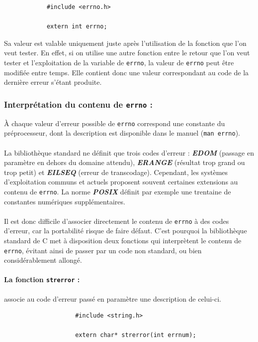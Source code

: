 		\begin{lstlisting}
			#include <errno.h>

			extern int errno;
		\end{lstlisting}
		
		Sa valeur est valable uniquement juste après l'utilisation de la fonction que l'on veut tester. En effet, si on utilise une autre fonction entre le retour que l'on veut tester et l'exploitation de la variable de \lstinline!errno!, la valeur de \lstinline!errno! peut être modifiée entre temps. Elle contient donc une valeur correspondant au code de la dernière erreur s'étant produite.
		
		\subsubsection*{Interprétation du contenu de \lstinline!errno! :}
			À chaque valeur d'erreur possible de \lstinline!errno! correspond une constante du préprocesseur, dont la description est disponible dans le manuel (\lstinline!man errno!).
			
			\paragraph{} La bibliothèque standard ne définit que trois codes d'erreur : \textbf{\textit{EDOM}} (passage en paramètre en dehors du domaine attendu), \textbf{\textit{ERANGE}} (résultat trop grand ou trop petit) et \textbf{\textit{EILSEQ}} (erreur de transcodage). Cependant, les systèmes d'exploitation communs et actuels proposent souvent certaines extensions au contenu de \lstinline!errno!. La norme \textbf{\textit{POSIX}} définit par exemple une trentaine de constantes numériques supplémentaires.
			
			\paragraph{} Il est donc difficile d'associer directement le contenu de \lstinline!errno! à des codes d'erreur, car la portabilité risque de faire défaut. C'est pourquoi la bibliothèque standard de C met à disposition deux fonctions qui interprètent le contenu de \lstinline!errno!, évitant ainsi de passer par un code non standard, ou bien considérablement allongé.
			
			\paragraph{La fonction \lstinline!strerror! :} associe au code d'erreur passé en paramètre une description de celui-ci.
				\begin{lstlisting}
					#include <string.h>
					
					extern char* strerror(int errnum);
				\end{lstlisting}
			
